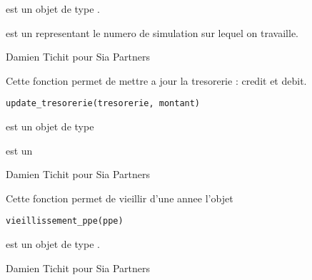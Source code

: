 \documentclass[a4paper]{book}
\begin{document}
%
\begin{Arguments}
\begin{ldescription}
\item[\code{alm}] est un objet de type .

\item[\code{num\_simu}] est un  representant le numero de simulation sur lequel on travaille.
\end{ldescription}
\end{Arguments}
%
\begin{Author}\relax
Damien Tichit pour Sia Partners
\end{Author}
%
\begin{Description}\relax
Cette fonction permet de mettre a jour la tresorerie : credit et debit.
\end{Description}
%
\begin{Usage}
\begin{verbatim}
update_tresorerie(tresorerie, montant)
\end{verbatim}
\end{Usage}
%
\begin{Arguments}
\begin{ldescription}
\item[\code{tresorerie}] est un objet de type 

\item[\code{montant}] est un 
\end{ldescription}
\end{Arguments}
%
\begin{Author}\relax
Damien Tichit pour Sia Partners
\end{Author}
%
\begin{Description}\relax
Cette fonction permet de vieillir d'une annee l'objet 
\end{Description}
%
\begin{Usage}
\begin{verbatim}
vieillissement_ppe(ppe)
\end{verbatim}
\end{Usage}
%
\begin{Arguments}
\begin{ldescription}
\item[\code{ppe}] est un objet de type .
\end{ldescription}
\end{Arguments}
%
\begin{Author}\relax
Damien Tichit pour Sia Partners
\end{Author}
\end{document}
